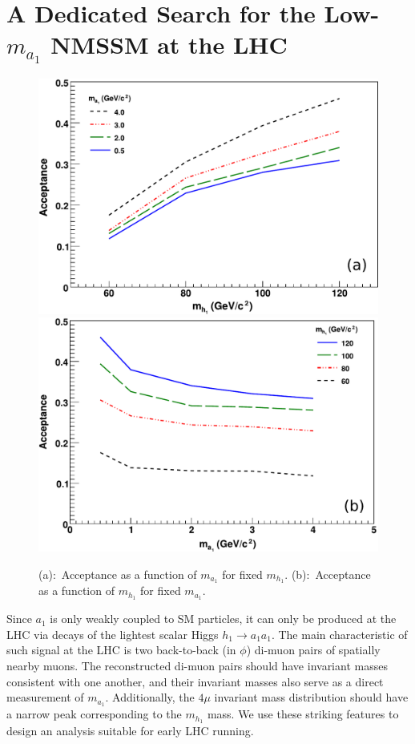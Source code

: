 \documentclass[aps,prl,twocolumn,nofootinbib,superscriptaddress]{revtex4}
\begin{document}
\section{A Dedicated Search for the Low-$m_{a_1}$ NMSSM at the LHC}

\begin{figure}[htbp]
\begin{center}
\includegraphics[width=0.48\linewidth]{plots/acceptance_vs_mh}
\hfill
\includegraphics[width=0.48\linewidth]{plots/acceptance_vs_ma}

\caption{(a):~Acceptance as a function of $m_{a_1}$ for fixed
  $m_{h_1}$.  (b):~Acceptance as a function of $m_{h_1}$ for fixed
  $m_{a_1}$.}
\label{signal_acceptance}
\end{center}
\end{figure}

Since $a_1$ is only weakly coupled to SM particles, it can only be
produced at the LHC via decays of the lightest scalar Higgs $h_1 \to
a_1 a_1$.  The main characteristic of such signal at the LHC is two
back-to-back (in $\phi$) di-muon pairs of spatially nearby muons.  The
reconstructed di-muon pairs should have invariant masses consistent
with one another, and their invariant masses also serve as a direct
measurement of $m_{a_1}$.  Additionally, the $4\mu$ invariant mass
distribution should have a narrow peak corresponding to the $m_{h_1}$
mass.  We use these striking features to design an analysis suitable
for early LHC running.
\end{document}
